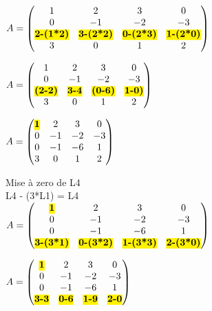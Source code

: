 $
A =
\begin{pmatrix}
  1 & 2 & 3 & 0 \\
  0 & -1 & -2 & -3 \\
  \hl{\textbf{2-(1*2)}} & \hl{\textbf{3-(2*2)}} & \hl{\textbf{0-(2*3)}} & \hl{\textbf{1-(2*0)}} \\
  3 & 0 & 1 & 2 \\
\end{pmatrix}
$

\vspace{5mm} %

$
A =
\begin{pmatrix}
  1 & 2 & 3 & 0 \\
  0 & -1 & -2 & -3 \\
  \hl{\textbf{(2-2)}} & \hl{\textbf{3-4}} & \hl{\textbf{(0-6)}} & \hl{\textbf{1-0)}} \\
  3 & 0 & 1 & 2 \\
\end{pmatrix}
$

\vspace{5mm} %

$
A =
\begin{pmatrix}
  \hl{\textbf{1}} & 2 & 3 & 0 \\
  0 & -1 & -2 & -3 \\
  0 & -1 & -6 & 1 \\
  3 & 0 & 1 & 2 \\
\end{pmatrix}
$

\vspace{3mm} %

Mise à zero de L4 \\
L4 - (3*L1) = L4 \\

$
A =
\begin{pmatrix}
  \hl{\textbf{1}} & 2 & 3 & 0 \\
  0 & -1 & -2 & -3 \\
  0 & -1 & -6 & 1 \\
  \hl{\textbf{3-(3*1)}} & \hl{\textbf{0-(3*2)}} & \hl{\textbf{1-(3*3)}} & \hl{\textbf{2-(3*0)}} \\
\end{pmatrix}
$

\vspace{5mm} %

$
A =
\begin{pmatrix}
  \hl{\textbf{1}} & 2 & 3 & 0 \\
  0 & -1 & -2 & -3 \\
  0 & -1 & -6 & 1 \\
  \hl{\textbf{3-3}} & \hl{\textbf{0-6}} & \hl{\textbf{1-9}} & \hl{\textbf{2-0}} \\
\end{pmatrix}
$

